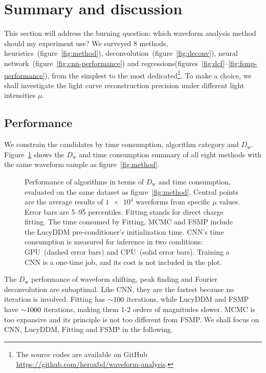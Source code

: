 \section{Summary and discussion}
\label{sec:discussion}

This section will address the burning question: which waveform analysis method should my experiment use?  We surveyed 8 methods, heuristics~(figure~\ref{fig:method}), deconvolution~(figure~\ref{fig:deconv}), neural network~(figure~\ref{fig:cnn-performance}) and regressions(figures~\ref{fig:dcf}--\ref{fig:fsmp-performance}), from the simplest to the most dedicated\footnote{The source codes are available on GitHub \url{https://github.com/heroxbd/waveform-analysis}.}.  To make a choice, we shall investigate the light curve reconstruction precision under different light intensities $\mu$.

\subsection{Performance}

We constrain the candidates by time consumption, algorithm category and $D_\mathrm{w}$.  Figure~\ref{fig:chargesummary} shows the $D_\mathrm{w}$ and time consumption summary of all eight methods with the same waveform sample as figure~\ref{fig:method}.
\begin{figure}[H]
    \centering
    \resizebox{\textwidth}{!}{}
    \caption{\label{fig:chargesummary} Performance of algorithms in terms of $D_\mathrm{w}$ and time consumption, evaluated on the same dataset as figure~\ref{fig:method}. Central points are the average results of $\num[retain-unity-mantissa=false]{1e4}$ waveforms from specific $\mu$ values.  Error bars are 5--95 percentiles.  Fitting stands for direct charge fitting. The time consumed by Fitting, MCMC and FSMP include the LucyDDM pre-conditioner's initialization time.  CNN's time consumption is measured for inference in two conditions: GPU\protect\footnotemark~(dashed error bars) and CPU\protect\footnotemark~(solid error bars).  Training a CNN is a one-time job, and its cost is not included in the plot.}
\end{figure}
\addtocounter{footnote}{-2}

The $D_\mathrm{w}$ performance of waveform shifting, peak finding and Fourier deconvolution are suboptimal.  Like CNN, they are the fastest because no iteration is involved.  Fitting has $\num{\sim 100}$ iterations, while LucyDDM and FSMP have $\num{\sim 1000}$ iterations, making them 1-2 orders of magnitudes slower.  MCMC is too expansive and its principle is not too different from FSMP.  We shall focus on CNN, LucyDDM, Fitting and FSMP in the following.  

